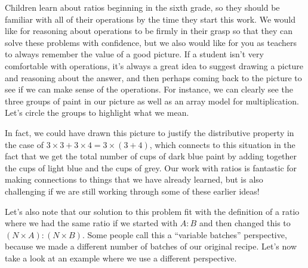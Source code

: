 \documentclass{ximera}
\begin{document}
Children learn about ratios beginning in the sixth grade, so they should be familiar with all of their operations by the time they start this work. We would like for reasoning about operations to be firmly in their grasp so that they can solve these problems with confidence, but we also would like for you as teachers to always remember the value of a good picture. If a student isn't very comfortable with operations, it's always a great idea to suggest drawing a picture and reasoning about the answer, and then perhaps coming back to the picture to see if we can make sense of the operations. For instance, we can clearly see the three groups of paint in our picture as well as an array model for multiplication. Let's circle the groups to highlight what we mean.

\begin{image}
 \end{image}

In fact, we could have drawn this picture to justify the distributive property in the case of $3 \times 3 + 3 \times 4 = 3 \times (3+4)$, which connects to this situation in the fact that we get the total number of cups of dark blue paint by adding together the cups of light blue and the cups of grey. Our work with ratios is fantastic for making connections to things that we have already learned, but is also challenging if we are still working through some of these earlier ideas!

Let's also note that our solution to this problem fit with the definition of a ratio where we had the same ratio if we started with $A:B$ and then changed this to $(N \times A) : (N \times B)$. Some people call this a ``variable batches'' perspective, because we made a different number of batches of our original recipe. Let's now take a look at an example where we use a different perspective.
\end{document}
